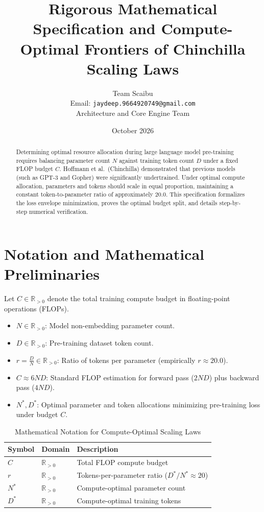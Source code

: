 \documentclass[11pt,a4paper]{article}
\title{\textbf{Rigorous Mathematical Specification and Compute-Optimal Frontiers of Chinchilla Scaling Laws}}
\author{Team Scaibu \\ \small Email: \texttt{jaydeep.9664920749@gmail.com} \\ \small Architecture and Core Engine Team}
\date{October 2026}
\theoremstyle{definition}
\begin{document}
\maketitle

\begin{abstract}
Determining optimal resource allocation during large language model pre-training requires balancing parameter count $N$ against training token count $D$ under a fixed FLOP budget $C$. Hoffmann et al.~(Chinchilla) demonstrated that previous models (such as GPT-3 and Gopher) were significantly undertrained. Under optimal compute allocation, parameters and tokens should scale in equal proportion, maintaining a constant token-to-parameter ratio of approximately $20.0$. This specification formalizes the loss envelope minimization, proves the optimal budget split, and details step-by-step numerical verification.
\end{abstract}

\section{Notation and Mathematical Preliminaries}

Let $C \in \mathbb{R}_{> 0}$ denote the total training compute budget in floating-point operations (FLOPs).

\begin{itemize}
    \item $N \in \mathbb{R}_{> 0}$: Model non-embedding parameter count.
    \item $D \in \mathbb{R}_{> 0}$: Pre-training dataset token count.
    \item $r = \frac{D}{N} \in \mathbb{R}_{> 0}$: Ratio of tokens per parameter (empirically $r \approx 20.0$).
    \item $C \approx 6 N D$: Standard FLOP estimation for forward pass ($2ND$) plus backward pass ($4ND$).
    \item $N^*, D^*$: Optimal parameter and token allocations minimizing pre-training loss under budget $C$.
\end{itemize}

\begin{table}[h]
\centering
\caption{Mathematical Notation for Compute-Optimal Scaling Laws}
\begin{tabular}{lll}
\toprule
\textbf{Symbol} & \textbf{Domain} & \textbf{Description} \\
\midrule
$C$ & $\mathbb{R}_{> 0}$ & Total FLOP compute budget \\
$r$ & $\mathbb{R}_{> 0}$ & Tokens-per-parameter ratio ($D^*/N^* \approx 20$) \\
$N^*$ & $\mathbb{R}_{> 0}$ & Compute-optimal parameter count \\
$D^*$ & $\mathbb{R}_{> 0}$ & Compute-optimal training tokens \\
\bottomrule
\end{tabular}
\end{table}
\end{document}
